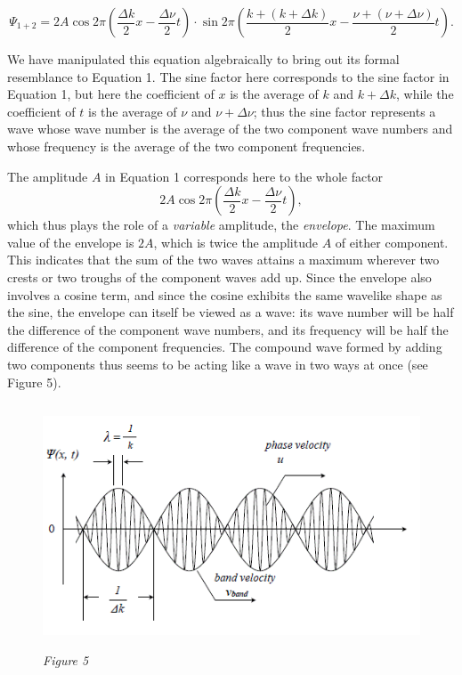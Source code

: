 \begin{equation*}
\Psi_{1+2} = 2A\cos 2\pi\left(\frac{\Delta k}{2}x - \frac{\Delta\nu}{2}t\right)
\cdot \sin 2\pi\left(\frac{k\!+\!(k\!+\!\Delta k)}{2}x - \frac{\nu\!+\!(\nu\! + \Delta\nu)}{2}t\right).
\end{equation*}

We have manipulated this equation algebraically to bring out its formal
resemblance to Equation 1. The sine factor here corresponds to the sine
factor in Equation 1, but here the coefficient of $x$ is the
average of $k$ and $k\! + \Delta k$, while the coefficient of
$t$ is the average of $\nu$ and $\nu\! + \Delta\nu$; thus the
sine factor represents a wave whose wave number is the average of the
two component wave numbers and whose frequency is the average of the two
component frequencies.

The amplitude $A$ in Equation 1 corresponds here to the whole
factor 
%
\begin{equation*}
2A\cos 2\pi\left(\frac{\Delta k}{2}x - \frac{\Delta\nu}{2}t\right) , 
\end{equation*}
%
which thus plays the role of a \emph{variable} amplitude, the
\emph{envelope}. The maximum value of the envelope is $2A$, which
is twice the amplitude $A$ of either component. This indicates that
the sum of the two waves attains a maximum wherever two crests or two
troughs of the component waves add up. Since the envelope also involves
a cosine term, and since the cosine exhibits the same wavelike shape as
the sine, the envelope can itself be viewed as a wave: its wave number
will be half the difference of the component wave numbers, and its
frequency will be half the difference of the component frequencies. The
compound wave formed by adding two components thus seems to be acting
like a wave in two ways at once (see Figure 5).

\begin{figure}[h] %
  \begin{center}
    \includegraphics[width=4.90625in,height=2.85417in]{images/08_debroglie/image036.png}
    \caption*{\emph{Figure 5}}
  \end{center}
\end{figure}

